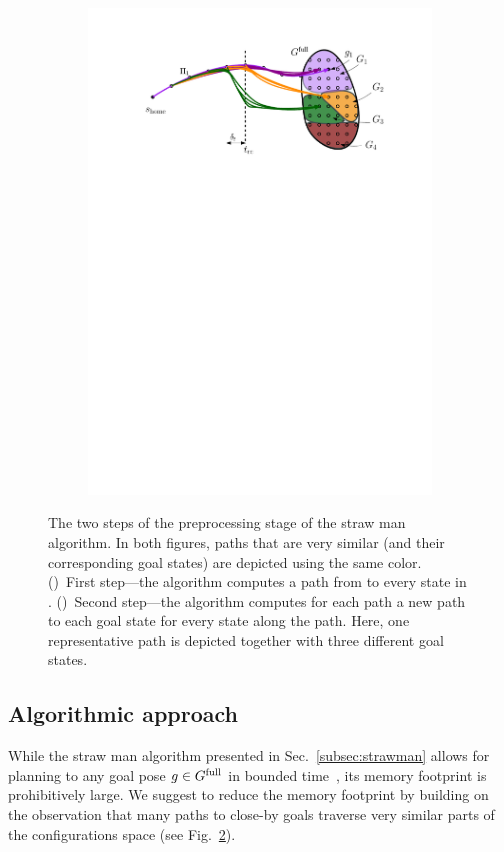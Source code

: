 \documentclass[conference]{IEEEtran}
\begin{document}
\begin{figure}[t]
\begin{subfigure}{0.225\textwidth}
        \includegraphics[width=\textwidth]{naive2}
        \caption{}
        \label{fig:naive2}
    \end{subfigure}
    \caption{The two steps of the preprocessing stage of the straw man algorithm. In both figures, paths that are very similar (and their corresponding goal states) are depicted using the same color.
    ()~First step---the algorithm computes a path from \Shome to every state in \Gfull.
    ()~Second step---the algorithm computes for each path a new path to each goal state for every state along the path. Here, one representative path is depicted together with three different goal states. }
    \label{fig:naive}
\end{figure}

\subsection{Algorithmic approach}
While the straw man algorithm presented in Sec.~\ref{subsec:strawman} allows for planning to any goal pose $ g \in G^{\textrm{full}}$ in bounded time~\Tbound, its memory footprint is prohibitively large.
%
We suggest to reduce the memory footprint by building on the observation that many paths to close-by goals traverse very similar parts of the configurations space (see Fig.~\ref{fig:naive}).
\end{document}
